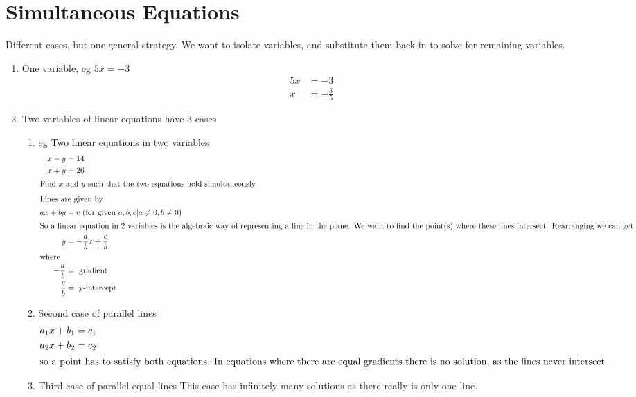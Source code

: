 \chapter{Simultaneous Equations}
\label{chap:SimultaneousEquations}

Different cases, but one general strategy. We want to isolate variables, and
substitute them back in to solve for remaining variables.

\begin{enumerate}
  \item One variable, eg $5x = -3$
  \begin{align}
    5x &= -3 \\
    x &= -\frac{3}{5}
  \end{align}
  \item Two variables of linear equations have 3 cases
  \begin{enumerate}
  \item eg Two linear equations in two variables
  \begin{align}
    x - y &= 14 \\
    x + y &= 26 \\
\intertext{Find $x$ and $y$ such that the two equations hold simultaneously}
\intertext{Lines are given by}
    ax +by &= c ~ (\text{for given $a,b,c | a\neq 0, b \neq 0$}) \nonumber \\
\intertext{So a linear equation in 2 variables is the algebraic way of
representing a line in the plane. We want to find the point(s) where these lines
intersect. Rearranging we can get}
    y &= -\frac{a}{b}x + \frac{c}{b} \\
\intertext{where}
    -\frac{a}{b} &= ~ \text{gradient} \\
    \frac{c}{b} &= ~ \text{y-intercept}
  \end{align}
  \item Second case of parallel lines
\begin{align}
  a_1x +b_1 &= c_1 \\
  a_2x +b_2 &= c_2 \\
\intertext{so a point has to satisfy both equations. In equations where there
are equal gradients there is no solution, as the lines never intersect}
  \end{align}
  \item Third case of parallel equal lines
  This case has infinitely many solutions as there really is only one line. 
  \end{enumerate}
\end{enumerate}

